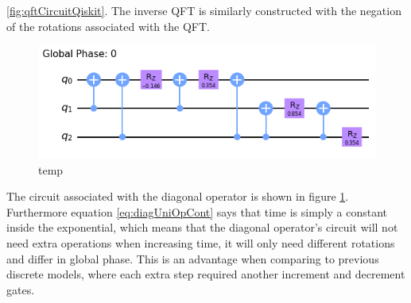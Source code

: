 \documentclass[../../dissertation.tex]{subfiles}
\begin{document}
\ref{fig:qftCircuitQiskit}. The inverse QFT is similarly constructed with the
negation of the rotations associated with the QFT.\par
\begin{figure}[!h]
	\centering
	\includegraphics[scale=0.50]{img/Qiskit/ContQuantumWalk/Circuits/circDiag_N3_S1.png}
	\caption{temp}
	\label{fig:diagCircuitQiskit}
\end{figure}
The circuit associated with the diagonal operator is shown in figure
\ref{fig:diagCircuitQiskit}. Furthermore equation \ref{eq:diagUniOpCont} says
that time is simply a constant inside the exponential, which means that the
diagonal operator's circuit will not need extra operations when increasing
time, it will only need different rotations and differ in global phase.  This
is an advantage when comparing to previous discrete models,  where each extra
step required another increment and decrement gates.\par
\end{document}
